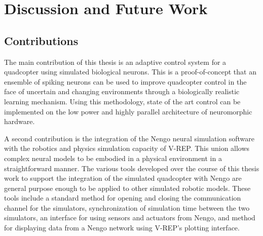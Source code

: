 \documentclass[letterpaper,12pt,titlepage,oneside,final]{book}
\begin{document}

 
\chapter{Discussion and Future Work} \label{chap:discussion}

\section{Contributions}


The main contribution of this thesis is an adaptive control system for a quadcopter using simulated biological neurons.
This is a proof-of-concept that an ensemble of spiking neurons can be used to improve quadcopter control in the face of uncertain and changing environments through a biologically realistic learning mechanism.
Using this methodology, state of the art control can be implemented on the low power and highly parallel architecture of neuromorphic hardware.

A second contribution is the integration of the Nengo neural simulation software with the robotics and physics simulation capacity of V-REP.
This union allows complex neural models to be embodied in a physical environment in a straightforward manner.
The various tools developed over the course of this thesis work to support the integration of the simulated quadcopter with Nengo are general purpose enough to be applied to other simulated robotic models.
These tools include a standard method for opening and closing the communication channel for the simulators, synchronization of simulation time between the two simulators, an interface for using sensors and actuators from Nengo, and method for displaying data from a Nengo network using V-REP's plotting interface.
\end{document}

